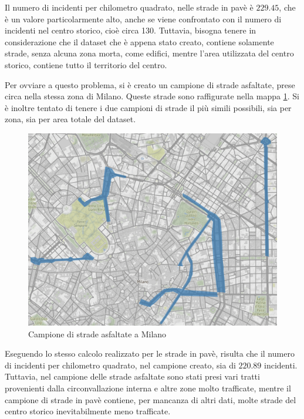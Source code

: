 \documentclass[a4paper]{report}
\begin{document}
Il numero di incidenti per chilometro quadrato, nelle strade in pavè è  $229.45$, che è un valore 
particolarmente alto, anche se viene confrontato con il numero di incidenti nel centro storico, 
cioè circa 130.
Tuttavia, bisogna tenere in considerazione che il dataset che è appena stato creato, contiene solamente 
strade, senza alcuna zona morta, come edifici, mentre l'area utilizzata del centro storico, 
contiene tutto il territorio del centro.

Per ovviare a questo problema, si è creato un campione di strade asfaltate, prese circa 
nella stessa zona di Milano. 
Queste strade sono raffigurate nella mappa \ref{fig:mappa-asfalto}. 
Si è inoltre tentato di tenere i due campioni di strade il più simili possibili, sia per zona, 
sia per area totale del dataset.

\begin{figure}
    \includegraphics[width=\linewidth]{../src/pave/mappa_asfalto.png}
    \caption{Campione di strade asfaltate a Milano}
    \label{fig:mappa-asfalto}
\end{figure}

Eseguendo lo stesso calcolo realizzato per le strade in pavè, risulta che il numero di incidenti per 
chilometro quadrato, nel campione creato, sia di $220.89$ incidenti.
Tuttavia, nel campione delle strade asfaltate sono stati presi vari tratti provenienti dalla 
circonvallazione interna e altre zone molto trafficate, mentre il campione di strade in pavè 
contiene, per mancanza di altri dati, molte strade del centro storico inevitabilmente 
meno trafficate.
\end{document}
